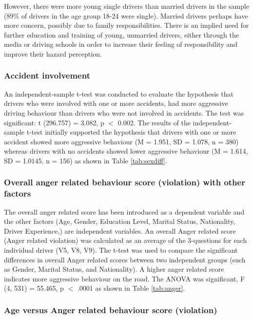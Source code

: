 \documentclass[preprint,12pt,a4paper,authoryear]{elsarticle}
\begin{document}
However, there were more young single drivers than married drivers in the sample (89\% of drivers in the age group 18-24 were single). Married drivers perhaps have more concern, possibly due to family responsibilities. There is an implied need for further education and training of young, unmarried drivers, either through the media or driving schools in order to increase their feeling of responsibility and improve their hazard perception. 

\subsubsection{Accident involvement}

An independent-sample t-test was conducted to evaluate the hypothesis that drivers who were involved with one or more accidents, had more aggressive driving behaviour than drivers who were not involved in accidents. The test was significant: t (296.757) = 3.082, p $<$ 0.002. The results of the independent-sample t-test initially supported the hypothesis that drivers with one or more accident showed more aggressive behaviour (M = 1.951, SD = 1.078, n = 380) whereas drivers with no accidents showed lower aggressive behaviour (M = 1.614, SD = 1.0145,  n = 156) as shown in Table \ref{tab:sexdiff}.

\subsubsection{Overall anger related behaviour score (violation) with other factors}

The overall anger related score has been introduced as a dependent variable and the other factors (Age, Gender, Education Level, Marital Status, Nationality, Driver Experience,) are independent variables. An overall Anger related score (Anger related violation) was calculated as an average of the 3-questions for each individual driver (V5, V8, V9).  The t-test was used to compare the significant differences in overall Anger related scores between two independent groups (such as Gender, Marital Status,  and Nationality). A higher anger related score indicates more aggressive behaviour on the road. The ANOVA was significant, F (4, 531) = 55.465, p $<$ .0001 as shown in Table \ref{tab:anger}.

\subsubsection{Age versus Anger related behaviour score (violation)}
\end{document}
